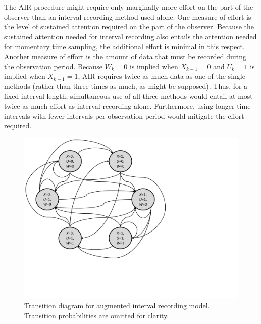 \documentclass[man, noextraspace, floatsintext]{apa6}\usepackage[]{graphicx}\usepackage[]{color}
\begin{document}
The AIR procedure might require only marginally more effort on the part of the observer than an interval recording method used alone. 
One measure of effort is the level of sustained attention required on the part of the observer. Because the sustained attention needed for interval recording also entails the attention needed for momentary time sampling, the additional effort is minimal in this respect.
Another measure of effort is the amount of data that must be recorded during the observation period. Because $W_k = 0$ is implied when $X_{k-1} = 0$ and $U_k = 1$ is implied when $X_{k-1} = 1$, AIR requires twice as much data as one of the single methods (rather than three times as much, as might be supposed). 
Thus, for a fixed interval length, simultaneous use of all three methods would entail at most twice as much effort as interval recording alone. 
Furthermore, using longer time-intervals with fewer intervals per observation period would mitigate the effort required. 

\begin{figure}[tbp]
\centering
\includegraphics[clip=true, trim= 0 130 200 00, width=0.9\linewidth]{ppt/AIR_transitions.pdf}
\caption{Transition diagram for augmented interval recording model. Transition probabilities are omitted for clarity.}
\label{fig:AIR_transitions}
\end{figure} 
\end{document}
